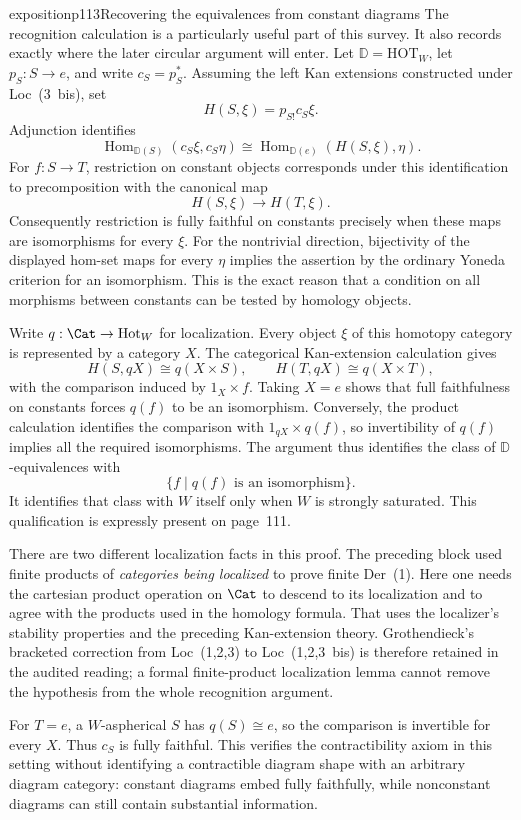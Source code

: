 \begin{dcomment}{exposition}{p113}{Recovering the equivalences from constant diagrams}
The recognition calculation is a particularly useful part of this survey. It also records exactly where the later circular argument will enter. Let $\mathbb D=\mathrm{HOT}_W$, let $p_S:S\to e$, and write $c_S=p_S^*$. Assuming the left Kan extensions constructed under Loc~(3~bis), set
\[
 H(S,\xi)=p_{S!}c_S\xi.
\]
Adjunction identifies
\[
 \operatorname{Hom}_{\mathbb D(S)}(c_S\xi,c_S\eta)
 \cong
 \operatorname{Hom}_{\mathbb D(e)}(H(S,\xi),\eta).
\]
For $f:S\to T$, restriction on constant objects corresponds under this identification to precomposition with the canonical map
\[
 H(S,\xi)\longrightarrow H(T,\xi).
\]
Consequently restriction is fully faithful on constants precisely when these maps are isomorphisms for every $\xi$. For the nontrivial direction, bijectivity of the displayed hom-set maps for every $\eta$ implies the assertion by the ordinary Yoneda criterion for an isomorphism. This is the exact reason that a condition on all morphisms between constants can be tested by homology objects.

Write $q:\Cat\to\mathrm{Hot}_W$ for localization. Every object $\xi$ of this homotopy category is represented by a category $X$. The categorical Kan-extension calculation gives
\[
 H(S,qX)\cong q(X\times S),\qquad
 H(T,qX)\cong q(X\times T),
\]
with the comparison induced by $1_X\times f$. Taking $X=e$ shows that full faithfulness on constants forces $q(f)$ to be an isomorphism. Conversely, the product calculation identifies the comparison with $1_{qX}\times q(f)$, so invertibility of $q(f)$ implies all the required isomorphisms. The argument thus identifies the class of $\mathbb D$-equivalences with
\[
 \{f\mid q(f)\text{ is an isomorphism}\}.
\]
It identifies that class with $W$ itself only when $W$ is strongly saturated. This qualification is expressly present on page~111.

There are two different localization facts in this proof. The preceding block used finite products of \emph{categories being localized} to prove finite Der~(1). Here one needs the cartesian product operation on $\Cat$ to descend to its localization and to agree with the products used in the homology formula. That uses the localizer's stability properties and the preceding Kan-extension theory. Grothendieck's bracketed correction from Loc~(1,2,3) to Loc~(1,2,3~bis) is therefore retained in the audited reading; a formal finite-product localization lemma cannot remove the hypothesis from the whole recognition argument.

For $T=e$, a $W$-aspherical $S$ has $q(S)\cong e$, so the comparison is invertible for every $X$. Thus $c_S$ is fully faithful. This verifies the contractibility axiom in this setting without identifying a contractible diagram shape with an arbitrary diagram category: constant diagrams embed fully faithfully, while nonconstant diagrams can still contain substantial information.
\end{dcomment}

